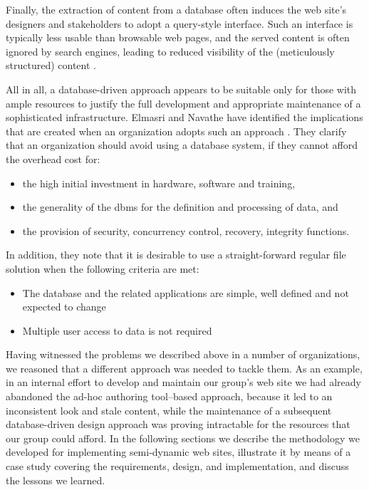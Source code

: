 \documentclass{article}
\begin{document}
Finally, the extraction of content from a database often
induces the web site's designers and stakeholders to adopt a
query-style interface.
Such an interface is typically less usable than browsable web pages,
and the served content is often ignored by search engines,
leading to reduced visibility
of the (meticulously structured) content \cite{DEEP_WEB,JP04}.

All in all, a database-driven approach appears to be suitable
only for those with ample resources to justify the full
development and appropriate maintenance of a sophisticated infrastructure.
Elmasri and Navathe have identified the implications that are created when an organization
adopts such an approach \cite{EN00}. They clarify that an organization should avoid
using a database system, if they cannot afford the overhead cost for:

\begin{itemize}
	\item the high initial investment in hardware, software and training,

	\item the generality of the {\sc dbms} for the definition and processing of data, and

	\item the provision of security, concurrency control, recovery, integrity functions.
\end{itemize}

In addition, they note that it is desirable to use a straight-forward regular file solution when the following criteria are met:

\begin{itemize}
	\item The database and the related applications are simple, well defined and not expected to change

	\item Multiple user access to data is not required
\end{itemize}

Having witnessed the problems we described above in a number of organizations,
we reasoned that a different approach was needed to tackle them.
As an example,
in an internal effort to develop and maintain our group's web site
we had already abandoned the ad-hoc authoring tool--based approach,
because it led to an inconsistent look and stale content,
while the maintenance of a subsequent database-driven
design approach was proving intractable for the resources that
our group could afford.
In the following sections we describe the methodology we developed
for implementing semi-dynamic web sites,
illustrate it by means
of a case study covering the requirements, design, and implementation,
and discuss the lessons we learned.
\end{document}
